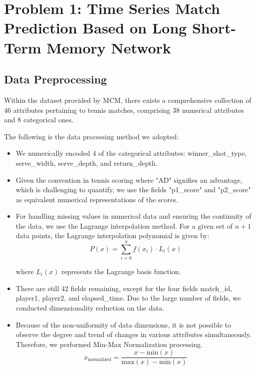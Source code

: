 \newpage
\section{Problem 1: Time Series Match Prediction Based on Long Short-Term Memory Network}
\subsection{Data Preprocessing}
Within the dataset provided by MCM, there exists a comprehensive collection of 46 attributes pertaining to tennis matches, comprising 38 numerical attributes and 8 categorical ones.

The following is the data processing method we adopted:
\begin{itemize}[label=$\bullet$]
  \item We numerically encoded 4 of the categorical attributes: winner\_shot\_type, serve\_width, serve\_depth, and return\_depth.
  \item Given the convention in tennis scoring where "AD" signifies an advantage, which is challenging to quantify, we use the fields "p1\_score" and "p2\_score" as equivalent numerical representations of the scores.
  \item For handling missing values in numerical data and ensuring the continuity of the data, we use the Lagrange interpolation method. For a given set of \(n+1\) data points, the Lagrange interpolation polynomial is given by:
  \begin{equation}
       P(x) = \sum_{i=0}^{n} f(x_i) \cdot L_i(x) 
  \end{equation}

where \(L_i(x)\) represents the Lagrange basis function.


   \item There are still 42 fields remaining, except for the four fields match\_id, player1, player2, and elapsed\_time. Due to the large number of fields, we conducted dimensionality reduction on the data.
   \item Because of  the non-uniformity of data dimensions, it is not possible to observe the degree and trend of changes in various attributes simultaneously. Therefore, we performed Min-Max Normalization processing.
  \begin{equation}
       x_{\text{normalized}} = \frac{x - \text{min}(x)}{\text{max}(x) - \text{min}(x)} 
  \end{equation}
\end{itemize}








